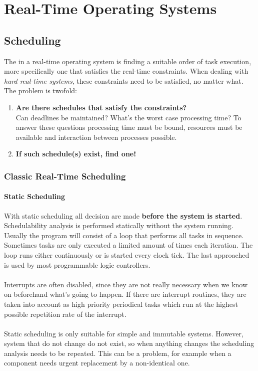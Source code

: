 \documentclass[../main.tex]{subfiles}
\begin{document}
\chapter{Real-Time Operating Systems}

\section{Scheduling}
The  in a real-time operating system is finding a suitable order of task execution, more specifically one that satisfies the real-time constraints.
When dealing with \textit{hard real-time systems}, these constraints need to be satisfied, no matter what. The problem is twofold:

\begin{enumerate}
	\item \textbf{Are there schedules that satisfy the constraints?} \\
	Can deadlines be maintained? What's the worst case processing time? To answer these questions processing time must be bound, resources must be available and interaction between processes possible.
	\item \textbf{If such schedule(s) exist, find one!}
\end{enumerate}

\subsection{Classic Real-Time Scheduling}
\subsubsection{Static Scheduling}
With static scheduling all decision are made \textbf{before the system is started}. Schedulability analysis is performed statically without the system running. Usually the program will consist of a loop that performs all tasks in sequence. Sometimes tasks are only executed a limited amount of times each iteration. The loop runs either continuously or is started every clock tick. The last approached is used by most programmable logic controllers.
\\\\
Interrupts are often disabled, since they are not really necessary when we know on beforehand what's going to happen. If there are interrupt routines, they are taken into account as high priority periodical tasks which run at the highest possible repetition rate of the interrupt.
\\\\
Static scheduling is only suitable for simple and immutable systems. However, system that do not change do not exist, so when anything changes the scheduling analysis needs to be repeated. This can be a problem, for example when a component needs urgent replacement by a non-identical one.
\end{document}
